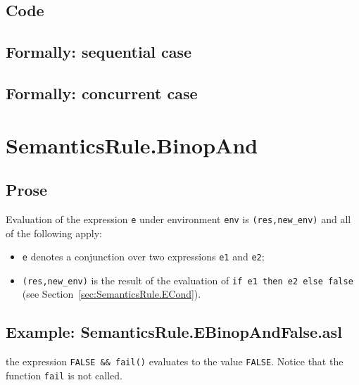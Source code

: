 \documentclass{book}
\begin{document}
  \subsection{Code}

\begin{emptyformal} 
  \subsection{Formally: sequential case}

  \subsection{Formally: concurrent case}
\end{emptyformal}


\section{SemanticsRule.BinopAnd \label{sec:SemanticsRule.BinopAnd}}

  \subsection{Prose}
  Evaluation of the expression \texttt{e} under environment \texttt{env} is
  \texttt{(res,new\_env)} and all of the following apply:
  \begin{itemize}
  \item \texttt{e} denotes a conjunction over two expressions \texttt{e1} and \texttt{e2};
  \item \texttt{(res,new\_env)} is the result of the evaluation of \texttt{if
e1 then e2 else false} (see Section~\ref{sec:SemanticsRule.ECond}).
  \end{itemize}

  \subsection{Example: SemanticsRule.EBinopAndFalse.asl}

    the expression \texttt{FALSE \&\& fail()} evaluates to the value \texttt{FALSE}. Notice that the function \texttt{fail} is not called.
\end{document}
